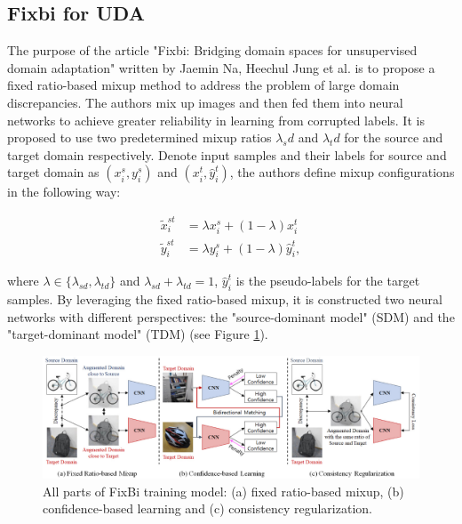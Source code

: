\subsection{Fixbi for UDA}

The purpose of the article "Fixbi: Bridging domain spaces for unsupervised domain adaptation" written by Jaemin Na, Heechul Jung et al. \cite{na2021fixbi} is to propose a  fixed ratio-based mixup method to address the problem of large domain discrepancies. The authors mix up images and then fed them into neural networks to achieve greater reliability in learning from corrupted labels. It is proposed to use two predetermined mixup ratios $\lambda_sd$ and $\lambda_td$ for the source and target domain respectively. 
Denote input samples and their labels for source and target domain as $(x_i^s, y_i^s)$ and $(x_i^t, \hat{y}_i^t)$, the authors define mixup configurations in the following way:

\begin{equation}
\begin{split}
 \tilde{x}^{st}_i &= \lambda x_i^s + (1 - \lambda)x_i^t\\
 \tilde{y}^{st}_i &= \lambda y_i^s + (1 - \lambda)\hat{y}_i^t,
\end{split}
\end{equation} 

where $\lambda \in \{\lambda_{sd}, \lambda_{td} \}$ and $\lambda_{sd} + \lambda_{td} = 1$, $\hat{y}_i^t$ is the pseudo-labels for the target samples. By leveraging the fixed ratio-based mixup, it is constructed two neural networks with different perspectives: the "source-dominant model" (SDM) and the "target-dominant model" (TDM) (see Figure \ref{fig: fixbi}).

\begin{figure}[H]
    \centering
    \includegraphics[width=\textwidth]{Figures/From articles/fixbi.png}
    \caption{All parts of FixBi training model: (a) fixed ratio-based mixup, (b)
confidence-based learning and (c) consistency regularization.}
    \label{fig: fixbi}
\end{figure}

